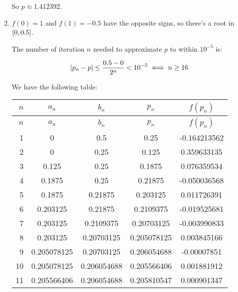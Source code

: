 \documentclass[../../Assignments.tex]{subfiles}
\begin{document}
\begin{solution}
\begin{enumerate}[label = (\alph*)]
            So \(p \approx \num{1.412392}\).

        \item \(f(0) = 1\) and \(f(1) = \num{-0.5}\) have the opposite signs, so
            there's a root in \(\interval{0}{\num{0.5}}\).

            The number of iteration \(n\) needed to approximate \(p\) to within
            \(10^{-5}\) is:

            \[\abs{p_n - p} \leq \frac{\num{0.5} - 0}{2^n} < 10^{-5} \iff n \geq 16\]

            We have the following table:

            \begin{longtable}{r S[table-format=1.9] S[table-format=1.9] S[table-format=1.9] S[table-format=-1.9]}
                \toprule
                \(n\)  &   {\(a_n\)}   &   {\(b_n\)}   &   {\(p_n\)}   &  {\(f(p_n)\)}  \\
                \midrule
                \endfirsthead
                \toprule
                \(n\)  &   {\(a_n\)}   &   {\(b_n\)}   &   {\(p_n\)}   &  {\(f(p_n)\)}  \\
                \midrule
                  &  0            &  0.5          &  0.25         &  -0.164213562  \\
                    2  &  0            &  0.25         &  0.125        &   0.359633135  \\
                    3  &  0.125        &  0.25         &  0.1875       &   0.076359534  \\
                    4  &  0.1875       &  0.25         &  0.21875      &  -0.050036568  \\
                    5  &  0.1875       &  0.21875      &  0.203125     &   0.011726391  \\
                    6  &  0.203125     &  0.21875      &  0.2109375    &  -0.019525681  \\
                    7  &  0.203125     &  0.2109375    &  0.20703125   &  -0.003990833  \\
                    8  &  0.203125     &  0.20703125   &  0.205078125  &   0.003845166  \\
                    9  &  0.205078125  &  0.20703125   &  0.206054688  &  -0.00007851   \\
                    10  &  0.205078125  &  0.206054688  &  0.205566406  &   0.001881912  \\
                    11  &  0.205566406  &  0.206054688  &  0.205810547  &   0.000901347  \\

\end{longtable}
\end{enumerate}
\end{solution}
\end{document}
